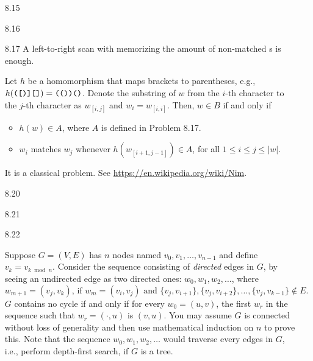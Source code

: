 \begin{itemize}
	\item[8.15]
	\Empty
	
	\item[8.16]
	\Empty
	
	\item[8.17]
	A left-to-right scan with memorizing the amount of non-matched \TT{(}s is enough.
	
	\item[\Star 8.18] 
	Let $h$ be a homomorphism that maps brackets to parentheses, e.g., $h(\texttt{([)][]}) = \texttt{(())()}$. Denote the substring of $w$ from the $i$-th character to the $j$-th character as $w_{[i,j]}$ and $w_i = w_{[i,i]}$. Then, $w \in B$ if and only if
	\begin{itemize}
		\item $h(w) \in A$, where $A$ is defined in Problem 8.17.
		\item $w_i$ matches $w_j$ whenever $h(w_{[i+1,j-1]}) \in A$, for all $1 \leq i \leq j \leq |w|$.
	\end{itemize}

	\item[\Star 8.19] 
	It is a classical problem. See \url{https://en.wikipedia.org/wiki/Nim}. 
	
	\item[8.20]
	\Empty
	
	\item[8.21]
	\Empty
	
	\item[8.22]
	\Empty
	
	\item[\Star 8.23]
	Suppose $G = (V, E)$ has $n$ nodes named $v_0, v_1, \dots, v_{n-1}$ and define $v_k = v_{k \bmod n}$. Consider the sequence consisting of \emph{directed} edges in $G$, by seeing an undirected edge as two directed ones: $w_0, w_1, w_2, \dots$, where
	$$
		w_{m+1} = (v_j, v_k) \text{, if $w_m = (v_i, v_j)$ and $\{v_j, v_{i+1}\}, \{v_j, v_{i+2}\}, \dots, \{v_j, v_{k-1}\} \notin E$.}
	$$
	$G$ contains no cycle if and only if for every $w_0 = (u, v)$, the first $w_r$ in the sequence such that $w_r = (\cdot, u)$ is $(v, u)$. You may assume $G$ is connected without loss of generality and then use mathematical induction on $n$ to prove this. Note that the sequence $w_0, w_1, w_2, \dots$ would traverse every edges in $G$, i.e., perform depth-first search, if $G$ is a tree.
	

\end{itemize}
